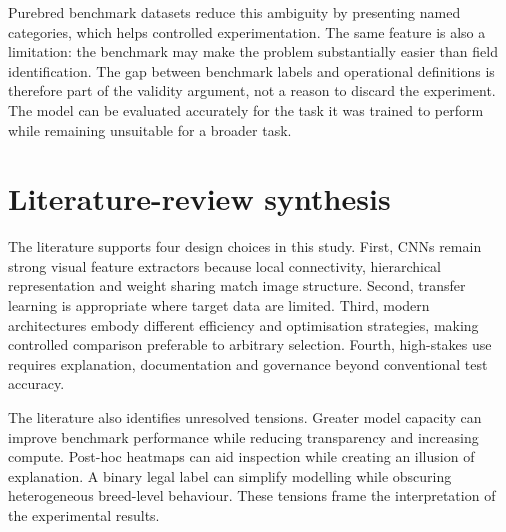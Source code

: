 Purebred benchmark datasets reduce this ambiguity by presenting named categories, which helps controlled experimentation. The same feature is also a limitation: the benchmark may make the problem substantially easier than field identification. The gap between benchmark labels and operational definitions is therefore part of the validity argument, not a reason to discard the experiment. The model can be evaluated accurately for the task it was trained to perform while remaining unsuitable for a broader task.

\section{Literature-review synthesis}
The literature supports four design choices in this study. First, CNNs remain strong visual feature extractors because local connectivity, hierarchical representation and weight sharing match image structure. Second, transfer learning is appropriate where target data are limited. Third, modern architectures embody different efficiency and optimisation strategies, making controlled comparison preferable to arbitrary selection. Fourth, high-stakes use requires explanation, documentation and governance beyond conventional test accuracy.

The literature also identifies unresolved tensions. Greater model capacity can improve benchmark performance while reducing transparency and increasing compute. Post-hoc heatmaps can aid inspection while creating an illusion of explanation. A binary legal label can simplify modelling while obscuring heterogeneous breed-level behaviour. These tensions frame the interpretation of the experimental results.
